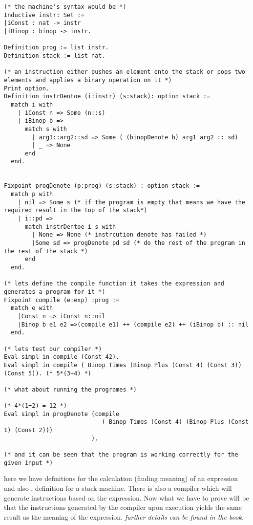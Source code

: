 \begin{verbatim}
(* the machine's syntax would be *)
Inductive instr: Set :=
|iConst : nat -> instr
|iBinop : binop -> instr.

Definition prog := list instr.
Definition stack := list nat.

(* an instruction either pushes an element onto the stack or pops two elements and applies a binary operation on it *)
Print option.
Definition instrDentoe (i:instr) (s:stack): option stack :=
  match i with
    | iConst n => Some (n::s)
    | iBinop b =>
      match s with
        | arg1::arg2::sd => Some ( (binopDenote b) arg1 arg2 :: sd)
        | _ => None
      end
  end.

                                        
Fixpoint progDenote (p:prog) (s:stack) : option stack :=
  match p with
    | nil => Some s (* if the program is empty that means we have the required result in the top of the stack*)
    | i::pd =>
      match instrDentoe i s with
        | None => None (* instrcution denote has failed *)
        |Some sd => progDenote pd sd (* do the rest of the program in the rest of the stack *)
      end
  end.

(* lets define the compile function it takes the expression and generates a program for it *)
Fixpoint compile (e:exp) :prog :=
  match e with
    |Const n => iConst n::nil
    |Binop b e1 e2 =>(compile e1) ++ (compile e2) ++ (iBinop b) :: nil
  end.

(* lets test our compiler *)
Eval simpl in compile (Const 42).
Eval simpl in compile ( Binop Times (Binop Plus (Const 4) (Const 3)) (Const 5)). (* 5*(3+4) *)

(* what about running the programes *)

(* 4*(1+2) = 12 *) 
Eval simpl in progDenote (compile
                            ( Binop Times (Const 4) (Binop Plus (Const 1) (Const 2)))
                         ).

(* and it can be seen that the program is working correctly for the given input *)

\end{verbatim}

here we have definitions for the calculation (finding meaning) of an expression and also , definition for
a stack machine. There is also a compiler which will generate instructions based on the expression.
Now what we have to prove will be that the instructions generated by the compiler upon execution yields
the same result as the meaning of the expression. \textit{further details can be found in the book.}

